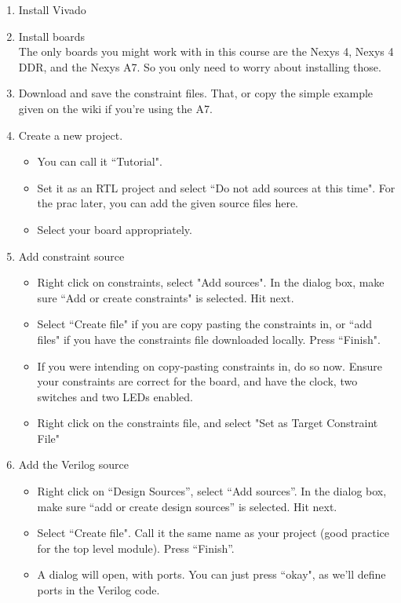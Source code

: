 \begin{enumerate}
    \item Install Vivado
    \item Install boards\\
    The only boards you might work with in this course are the Nexys 4, Nexys 4 DDR, and the Nexys A7. So you only need to worry about installing those.
    \item Download and save the constraint files. That, or copy the simple example given on the wiki if you're using the A7.
    \item Create a new project. 
    \begin{itemize}
        \item You can call it ``Tutorial".
        \item Set it as an RTL project and select ``Do not add sources at this time". For the prac later, you can add the given source files here.
        \item Select your board appropriately.
    \end{itemize}
    \item Add constraint source
    \begin{itemize}
        \item Right click on constraints, select "Add sources". In the dialog box, make sure ``Add or create constraints" is selected. Hit next.
        \item Select ``Create file" if you are copy pasting the constraints in, or ``add files" if you have the constraints file downloaded locally. Press ``Finish".
        \item If you were intending on copy-pasting constraints in, do so now. Ensure your constraints are correct for the board, and have the clock, two switches and two LEDs enabled.
        \item Right click on the constraints file, and select "Set as Target Constraint File"
    \end{itemize}
    \item Add the Verilog source
    \begin{itemize}
        \item Right click on ``Design Sources'', select ``Add sources''. In the dialog box, make sure ``add or create design sources'' is selected. Hit next.
        \item Select ``Create file". Call it the same name as your project (good practice for the top level module). Press ``Finish''.
        \item A dialog will open, with ports. You can just press ``okay", as we'll define ports in the Verilog code.

\end{itemize}
\end{enumerate}
